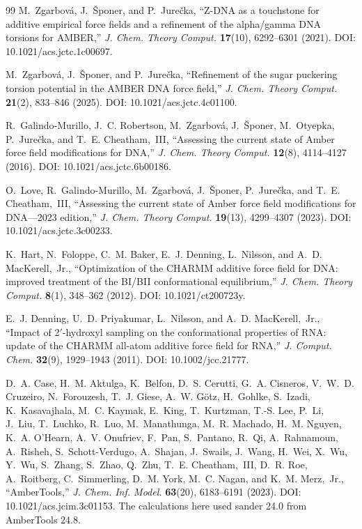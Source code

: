 \begin{thebibliography}{99}
M.~Zgarbov\'a, J.~\v{S}poner, and P.~Jure\v{c}ka,
``Z-DNA as a touchstone for additive empirical force fields and a refinement of
the alpha/gamma DNA torsions for AMBER,''
\emph{J. Chem. Theory Comput.} \textbf{17}(10), 6292--6301 (2021).
DOI: 10.1021/acs.jctc.1c00697.

M.~Zgarbov\'a, J.~\v{S}poner, and P.~Jure\v{c}ka,
``Refinement of the sugar puckering torsion potential in the AMBER DNA force
field,''
\emph{J. Chem. Theory Comput.} \textbf{21}(2), 833--846 (2025).
DOI: 10.1021/acs.jctc.4c01100.

R.~Galindo-Murillo, J.~C. Robertson, M.~Zgarbov\'a, J.~\v{S}poner, M.~Otyepka,
P.~Jure\v{c}ka, and T.~E. Cheatham,~III,
``Assessing the current state of Amber force field modifications for DNA,''
\emph{J. Chem. Theory Comput.} \textbf{12}(8), 4114--4127 (2016).
DOI: 10.1021/acs.jctc.6b00186.

O.~Love, R.~Galindo-Murillo, M.~Zgarbov\'a, J.~\v{S}poner, P.~Jure\v{c}ka, and
T.~E. Cheatham,~III,
``Assessing the current state of Amber force field modifications for
DNA---2023 edition,''
\emph{J. Chem. Theory Comput.} \textbf{19}(13), 4299--4307 (2023).
DOI: 10.1021/acs.jctc.3c00233.

K.~Hart, N.~Foloppe, C.~M. Baker, E.~J. Denning, L.~Nilsson, and
A.~D. MacKerell,~Jr.,
``Optimization of the CHARMM additive force field for DNA: improved treatment
of the BI/BII conformational equilibrium,''
\emph{J. Chem. Theory Comput.} \textbf{8}(1), 348--362 (2012).
DOI: 10.1021/ct200723y.

E.~J. Denning, U.~D. Priyakumar, L.~Nilsson, and A.~D. MacKerell,~Jr.,
``Impact of 2$'$-hydroxyl sampling on the conformational properties of RNA:
update of the CHARMM all-atom additive force field for RNA,''
\emph{J. Comput. Chem.} \textbf{32}(9), 1929--1943 (2011).
DOI: 10.1002/jcc.21777.

D.~A. Case, H.~M. Aktulga, K.~Belfon, D.~S. Cerutti, G.~A. Cisneros,
V.~W.~D. Cruzeiro, N.~Forouzesh, T.~J. Giese, A.~W. G\"otz, H.~Gohlke,
S.~Izadi, K.~Kasavajhala, M.~C. Kaymak, E.~King, T.~Kurtzman, T.-S. Lee,
P.~Li, J.~Liu, T.~Luchko, R.~Luo, M.~Manathunga, M.~R. Machado, H.~M. Nguyen,
K.~A. O'Hearn, A.~V. Onufriev, F.~Pan, S.~Pantano, R.~Qi, A.~Rahnamoun,
A.~Risheh, S.~Schott-Verdugo, A.~Shajan, J.~Swails, J.~Wang, H.~Wei, X.~Wu,
Y.~Wu, S.~Zhang, S.~Zhao, Q.~Zhu, T.~E. Cheatham,~III, D.~R. Roe,
A.~Roitberg, C.~Simmerling, D.~M. York, M.~C. Nagan, and K.~M. Merz,~Jr.,
``AmberTools,''
\emph{J. Chem. Inf. Model.} \textbf{63}(20), 6183--6191 (2023).
DOI: 10.1021/acs.jcim.3c01153.
The calculations here used sander 24.0 from AmberTools 24.8.


\end{thebibliography}
